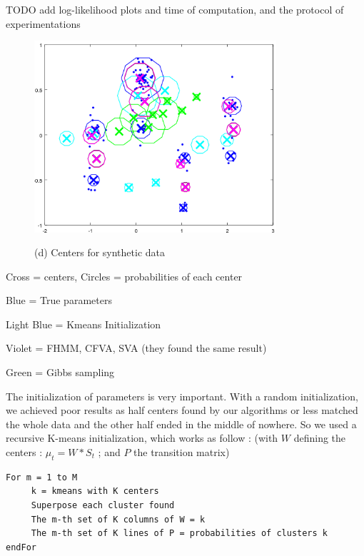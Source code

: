 \documentclass[10pt,a4paper]{report}
\begin{document}
TODO add log-likelihood plots and time of computation, and the protocol of experimentations

\newpage


\begin{figure}[h]
	\centering
	\includegraphics[width=0.8\textwidth]{fig11.png}
	\centerline{\Large{(d) Centers for synthetic data}}
	\label{fig:c}
\end{figure}
\begin{center}
	Cross = centers, Circles = probabilities of each center
	
	Blue = True parameters
	
	Light Blue = Kmeans Initialization
	
	Violet = FHMM, CFVA, SVA (they found the same result)
	
	Green = Gibbs sampling
	
\end{center}
\vspace{30pt}

The initialization of parameters is very important. With a random initialization, we achieved poor results as half centers found by our algorithms or less matched the whole data and the other half ended in the middle of nowhere. So we used a recursive K-means initialization, which works as follow : (with $W$ defining the centers : $\mu_t = W*S_t$ ; and $P$ the transition matrix)

\begin{verbatim}
For m = 1 to M
     k = kmeans with K centers
     Superpose each cluster found
     The m-th set of K columns of W = k
     The m-th set of K lines of P = probabilities of clusters k
endFor
\end{verbatim}
\end{document}
